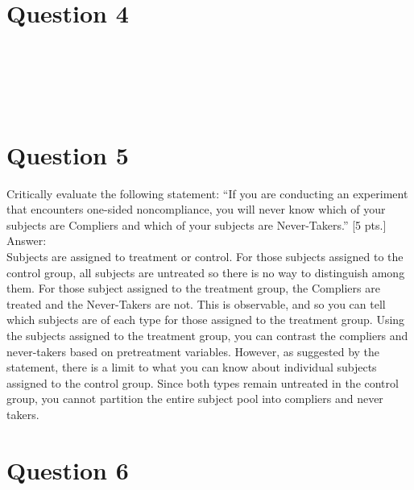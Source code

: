 \documentclass[11pt,notitlepage]{article}\usepackage[]{graphicx}\usepackage[]{color}
\makeatletter
\newenvironment{kframe}{%
 \def\at@end@of@kframe{}%
 \ifinner\ifhmode%
  \def\at@end@of@kframe{\end{minipage}}%
  \begin{minipage}{\columnwidth}%
 \fi\fi%
 \def\FrameCommand##1{\hskip\@totalleftmargin \hskip-\fboxsep
 \colorbox{shadecolor}{##1}\hskip-\fboxsep
     \hskip-\linewidth \hskip-\@totalleftmargin \hskip\columnwidth}%
 \MakeFramed {\advance\hsize-\width
   \@totalleftmargin\z@ \linewidth\hsize
   \@setminipage}}%
 {\par\unskip\endMakeFramed%
 \at@end@of@kframe}
\newenvironment{knitrout}{}{} %
\makeatother
\begin{document}
\section*{Question 4}
\begin{knitrout}
\color{fgcolor}\begin{kframe}
\begin{verbatim}





\end{verbatim}
\end{kframe}
\end{knitrout}

\section*{Question 5}
Critically evaluate the following statement: ``If you are conducting an experiment that encounters one-sided noncompliance, you will never know which of your subjects are Compliers and which of your subjects are Never-Takers.'' [5 pts.]\\
Answer:\\
Subjects are assigned to treatment or control. For those subjects assigned to the control group, all subjects are untreated so there is no way to distinguish among them. For those subject assigned to the treatment group, the Compliers are treated and the Never-Takers are not. This is observable, and so you can tell which subjects are of each type for those assigned to the treatment group. Using the subjects assigned to the treatment group, you can contrast the compliers and never-takers based on pretreatment variables.  However, as suggested by the statement, there is a limit to what you can know about individual subjects assigned to the control group. Since both types remain untreated in the control group, you cannot partition the entire subject pool into compliers and never takers.

\section*{Question 6}
\begin{knitrout}
\color{fgcolor}\begin{kframe}
\begin{verbatim}





\end{verbatim}
\end{kframe}
\end{knitrout}
\end{document}
